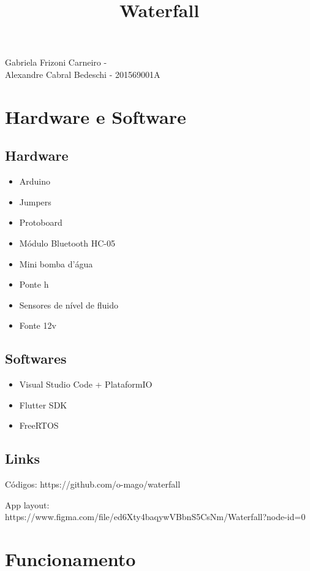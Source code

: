 \documentclass[12pt,a4paper]{article}
\author{}
\title{Waterfall}
\begin{document}
\maketitle
\vfill
\begin{center}
Gabriela Frizoni Carneiro - 
\\
Alexandre Cabral Bedeschi - 201569001A
\end{center}
\newpage

\section{Hardware e Software}

\subsection{Hardware}
\begin{itemize}
    \item Arduino
    \item Jumpers
    \item Protoboard
    \item Módulo Bluetooth HC-05
    \item Mini bomba d'água
    \item Ponte h
    \item Sensores de nível de fluido
    \item Fonte 12v
\end{itemize}

\subsection{Softwares}

\begin{itemize}
    \item Visual Studio Code + PlataformIO
    \item Flutter SDK
    \item FreeRTOS
\end{itemize}

\subsection{Links}
Códigos: https://github.com/o-mago/waterfall

App layout: https://www.figma.com/file/ed6Xty4baqywVBbnS5CsNm/Waterfall?node-id=0%

\newpage
\section{Funcionamento}
\end{document}

